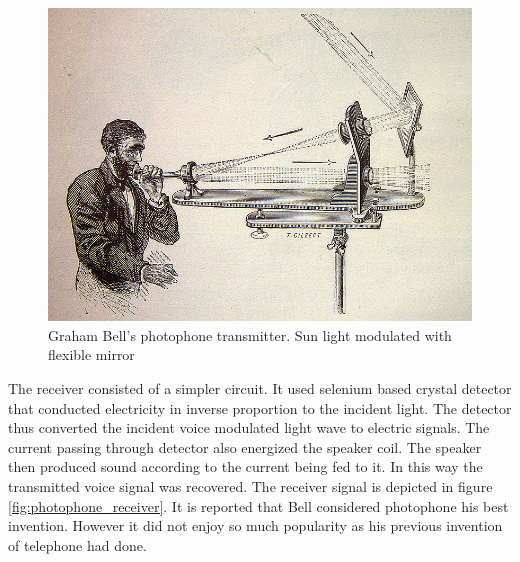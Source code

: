 
\begin{figure}[!hbtp]
\centering
\includegraphics[angle=0,width=\figwidth]{./Figures/Photophone_transmitter.jpg}
\caption[Photophone transmitter]{Graham Bell's photophone transmitter. Sun light modulated with flexible mirror\cite{photoTx}}
\label{fig:photophone_transmitter}
\end{figure}

%
The receiver consisted of a simpler circuit. It used selenium based crystal detector that conducted electricity in inverse proportion to the incident light. The detector thus converted the incident voice modulated light wave to electric signals. The current passing through detector also energized the speaker coil. The speaker then produced sound according to the current being fed to it. In this way the transmitted voice signal was recovered. The receiver signal is depicted in figure \ref{fig:photophone_receiver}. It is reported that Bell considered photophone his best invention. However it did not enjoy so much popularity as his previous invention of telephone had done. 




